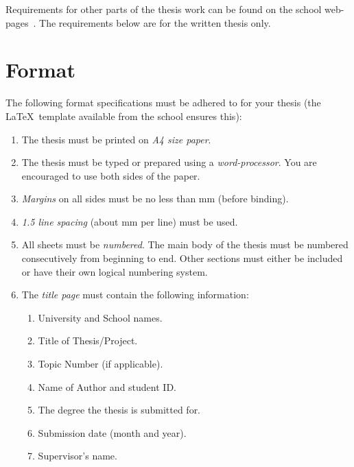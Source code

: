 Requirements for other parts of the thesis work can be found on the school
web-pages~\cite{Noo05}.  The requirements below are for the written thesis
only.

\section{Format}
The following format specifications must be adhered to for your thesis
(the \LaTeX\ template available from the school ensures this):
\begin{enumerate}
\item The thesis must be printed on \emph{A4 size paper}.
\item The thesis must be typed or prepared using a \emph{word-processor}.
You are encouraged to use both sides of the paper.
\item \emph{Margins} on all sides must be no less than \unit[25]{mm} (before
binding).
\item \emph{1.5 line spacing} (about \unit[8]{mm} per line) must be used.
\item All sheets must be \emph{numbered}. The main body of the thesis must be
numbered consecutively from beginning to end.  Other sections must either
be included or have their own logical numbering system.
\item The \emph{title page} must contain the following information:
\begin{enumerate}
\item University and School names.
\item Title of Thesis/Project.
\item Topic Number (if applicable).
\item Name of Author and student ID.
\item The degree the thesis is submitted for.
\item Submission date (month and year).
\item Supervisor's name.
\end{enumerate}
\end{enumerate}

